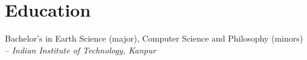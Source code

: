 \documentclass[a4paper,10pt]{article}
\begin{document}


\section{Education}

\noindent
Bachelor's in Earth Science (major), Computer Science and Philosophy (minors) -- \textit{Indian Institute of Technology, Kanpur}
\end{document}
